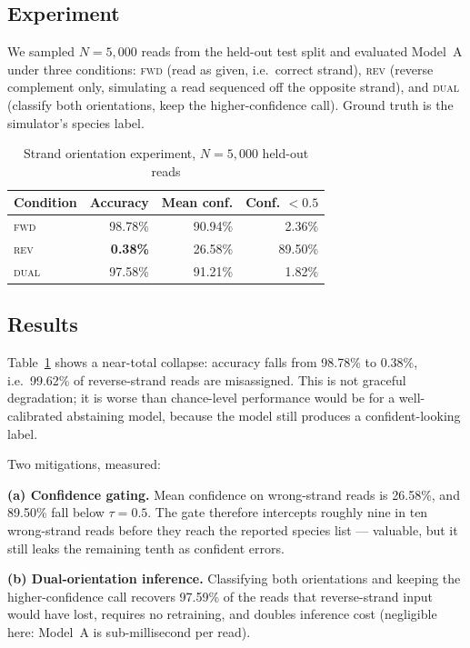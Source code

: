 \documentclass[conference]{IEEEtran}
\begin{document}
\subsection{Experiment}
We sampled $N=5{,}000$ reads from the held-out test split and evaluated
Model~A under three conditions: \textsc{fwd} (read as given, i.e.\ correct
strand), \textsc{rev} (reverse complement only, simulating a read
sequenced off the opposite strand), and \textsc{dual} (classify both
orientations, keep the higher-confidence call). Ground truth is the
simulator's species label.

\begin{table}[t]
\caption{Strand orientation experiment, $N=5{,}000$ held-out reads}
\label{tab:strand}
\centering
\begin{tabular}{lrrr}
\toprule
Condition & Accuracy & Mean conf. & Conf. $<0.5$ \\
\midrule
\textsc{fwd}  & 98.78\% & 90.94\% & 2.36\% \\
\textsc{rev}  & \textbf{0.38\%} & 26.58\% & 89.50\% \\
\textsc{dual} & 97.58\% & 91.21\% & 1.82\% \\
\bottomrule
\end{tabular}
\end{table}

\subsection{Results}
Table~\ref{tab:strand} shows a near-total collapse: accuracy falls from
98.78\% to 0.38\%, i.e.\ 99.62\% of reverse-strand reads are misassigned.
This is not graceful degradation; it is worse than chance-level performance
would be for a well-calibrated abstaining model, because the model still
produces a confident-looking label.

Two mitigations, measured:

\textbf{(a) Confidence gating.} Mean confidence on wrong-strand reads is
26.58\%, and 89.50\% fall below $\tau=0.5$. The gate therefore intercepts
roughly nine in ten wrong-strand reads before they reach the reported
species list --- valuable, but it still leaks the remaining tenth as
confident errors.

\textbf{(b) Dual-orientation inference.} Classifying both orientations and
keeping the higher-confidence call recovers 97.59\% of the reads that
reverse-strand input would have lost, requires no retraining, and doubles
inference cost (negligible here: Model~A is sub-millisecond per read).
\end{document}
